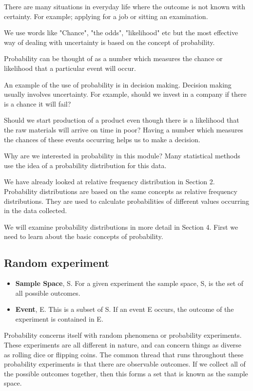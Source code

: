\documentclass[12pt]{article}
\begin{document}
There are many situations in everyday life where the outcome is not known with certainty. For example; applying for a job or sitting an examination.

We use words like "Chance", "the odds", "likelihood" etc but the most effective way of dealing with uncertainty is based on the concept of probability.

Probability can be thought of as a number which measures the chance or likelihood that a particular event will occur.


An example of the use of probability is in decision making. Decision making usually involves uncertainty. For example, should we invest in a company if there is a chance it will fail? 

Should we start production of a product even though there is a likelihood that the raw materials will arrive on time in poor? Having a number which measures the chances of these events occurring helps us to make a decision.



Why are we interested in probability in this module? Many statistical methods use the idea of a probability distribution for this data.

We have already looked at relative frequency distribution in Section 2. Probability distributions are based on the same concepts as relative frequency distributions. They are used to calculate probabilities of different values occurring in the data collected.

We will examine probability distributions in more detail in Section 4. First we need to learn about the basic concepts of probability.


\subsection{Random experiment}
\begin{itemize}
\item \textbf{Sample Space}, S. For a given experiment the sample space, S, is the set of all
possible outcomes.
\item \textbf{Event}, E. This is a subset of S. If an event E occurs, the outcome of the experiment is contained in E.
\end{itemize}

Probability concerns itself with random phenomena or probability experiments. These experiments are all different in nature, and can concern things as diverse as rolling dice or flipping coins. The common thread that runs throughout these probability experiments is that there are observable outcomes. If we collect all of the possible outcomes together, then this forms a set that is known as the sample space.
\end{document}
